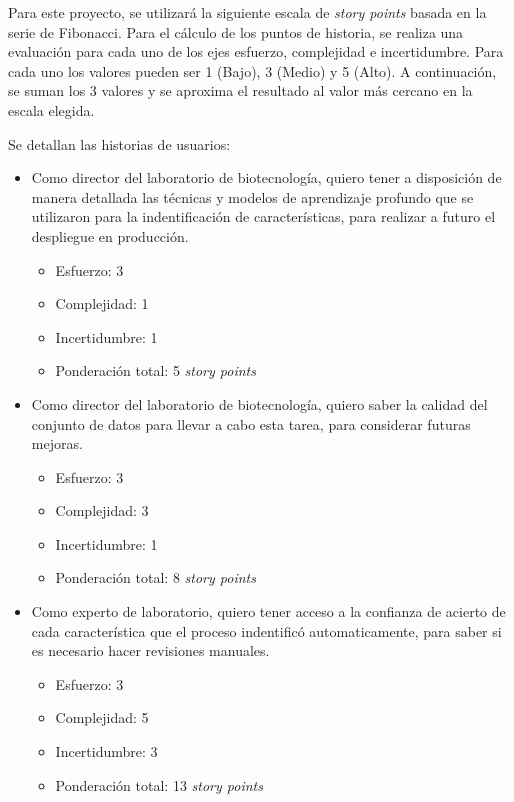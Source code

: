\documentclass[
11pt, %
]{charter}
\begin{document}
Para este proyecto, se utilizará la siguiente escala de \textit{story points} basada en la serie de Fibonacci.
Para el cálculo de los puntos de historia, se realiza una evaluación para cada uno de los ejes
esfuerzo, complejidad e incertidumbre. Para cada uno los valores pueden ser 1 (Bajo), 3 (Medio) y 5 (Alto).
A continuación, se suman los 3 valores y se aproxima el resultado al valor más cercano en la escala elegida.

Se detallan las historias de usuarios:
\begin{itemize}
    \item Como director del laboratorio de biotecnología, quiero tener a disposición de manera detallada las técnicas y modelos de aprendizaje profundo
          que se utilizaron para la indentificación de características, para realizar a futuro el despliegue en producción.
        \begin{itemize}
            \item Esfuerzo: 3
            \item Complejidad: 1
            \item Incertidumbre: 1 
            \item Ponderación total: 5 \textit{story points} 
        \end{itemize}
    \item Como director del laboratorio de biotecnología, quiero saber la calidad del conjunto de datos para llevar 
        a cabo esta tarea, para considerar futuras mejoras.
        \begin{itemize}
            \item Esfuerzo: 3 
            \item Complejidad: 3
            \item Incertidumbre: 1
            \item Ponderación total: 8 \textit{story points} 
        \end{itemize}
    \item Como experto de laboratorio, quiero tener acceso a la confianza de acierto
    de cada característica que el proceso indentificó automaticamente, para saber si es necesario hacer revisiones manuales.
        \begin{itemize}
            \item Esfuerzo: 3 
            \item Complejidad: 5 
            \item Incertidumbre: 3
            \item Ponderación total: 13 \textit{story points} 

\end{itemize}
\end{itemize}
\end{document}
